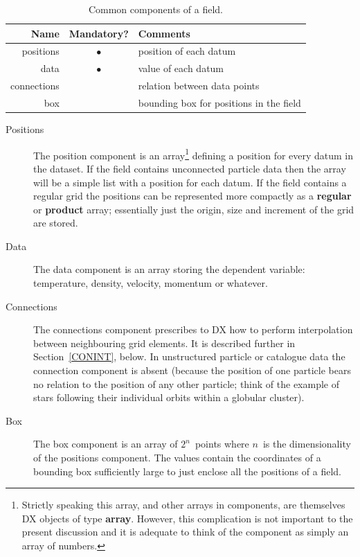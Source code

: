 \documentclass[twoside,11pt]{article}
\begin{document}
\begin{table}[htbp]

\begin{center}
\begin{tabular}{rcl}
Name        & Mandatory? & Comments                                \\ \hline
positions   & $\bullet$  & position of each datum                  \\
data        & $\bullet$  & value of each datum                     \\
connections &            & relation between data points            \\
box         &            & bounding box for positions in the field \\
\end{tabular}
\end{center}

\begin{quote}
\item \caption[Common components of a field.]{Common components of a field.
\label{COMPONENTS} }
\end{quote}

\end{table}

\begin{description}

  \item[Positions] The position component is an array\footnote{Strictly
   speaking this array, and other arrays in components, are themselves
   DX objects of type {\bf array}. However, this complication is not
   important to the present discussion and it is adequate to think of
   the component as simply an array of numbers.} defining a
   position for every datum in the dataset. If the field contains
   unconnected particle data then the array will be a simple list
   with a position for each datum. If the field contains a regular
   grid the positions can be represented more compactly as a {\bf
   regular} or {\bf product} array; essentially just the origin, size
   and increment of the grid are stored.

  \item[Data] The data component is an array storing the dependent
   variable: temperature, density, velocity, momentum or whatever.

  \item[Connections] The connections component prescribes to DX how
   to perform interpolation between neighbouring grid elements. It
   is described further in Section~\ref{CONINT}, below. In unstructured
   particle or catalogue data the connection component is absent
   (because the position of one particle bears no relation to the
   position of any other particle; think of the example of stars following
   their individual orbits within a globular cluster).

  \item[Box] The box component is an array of $2^{n}$\, points where
   $n$\, is the dimensionality of the positions component. The values
   contain the coordinates of a bounding box sufficiently large to
   just enclose all the positions of a field.

\end{description}
\end{document}

